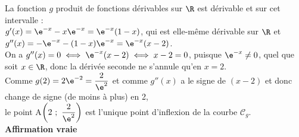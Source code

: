 La fonction $g$ produit de fonctions dérivables sur $\R$ est dérivable et sur cet intervalle :\\
$g'(x) = \e^{-x} - x\e^{-x} = \e^{-x}(1 - x)$, qui est elle-même dérivable sur $\R$ et \\
$g''(x) = -\e^{-x} - (1 - x)\e^{-x} = \e^{-x}(x - 2)$.\\
On a $g''(x) = 0 \iff \e^{-x}(x - 2) \iff x - 2 = 0$, puisque $\e^{-x} \ne 0$, quel que soit $x \in \R$, donc la dérivée seconde ne s'annule qu'en $x = 2$.\\
Comme $g(2) = 2\e^{-2} = \dfrac{2}{\e^2}$ et comme $g''(x)$ a le signe de $(x - 2)$ et donc change de signe (de moins à plus) en 2,\\
 le point A$\left(2~;~\dfrac{2}{\e^2}\right)$ est l'unique point d'inflexion de la courbe $\mathcal{C}_g$.\\
\hfill\textbf{Affirmation vraie}